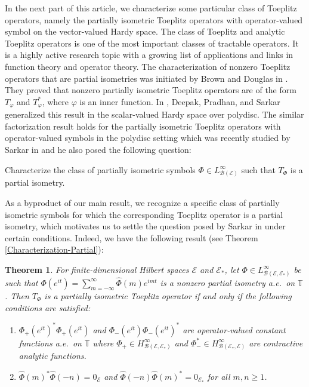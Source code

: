 \documentclass[12pt]{amsart}
\newcommand{\clb}{\mathcal{B}}
\newcommand{\cle}{\mathcal{E}}
\newcommand{\NI}{\noindent}
\newcommand{\T}{\mathbb{T}}
\theoremstyle{definition}
\theoremstyle{plain}
\newtheorem{thm}{Theorem}[section]
\theoremstyle{definition}
\numberwithin{equation}{section}
\let\phi=\varphi
\begin{document}
In the next part of this article, we characterize some particular class of Toeplitz operators, namely the partially isometric Toeplitz operators with operator-valued symbol on the vector-valued Hardy space. The class of Toeplitz and analytic Toeplitz operators is one of the most important classes of tractable operators.
It is a highly active research topic with a growing list of applications and links in function theory and operator theory. The characterization of nonzero Toeplitz operators that are partial isometries was initiated by Brown and Douglas in \cite{BD-Partially}. They proved that nonzero partially isometric Toeplitz operators are of the form $T_{\phi}$ and $T^{*}_{\phi}$, where $\phi$ is an inner function. In \cite{DPS-Partially}, Deepak, Pradhan, and Sarkar generalized this result in the scalar-valued Hardy space over polydisc. The similar factorization result holds for the partially isometric Toeplitz operators with operator-valued symbols in the polydisc setting which was recently studied by Sarkar in \cite{ss} and he also posed the following question:

\begin{center}
\textsf{Characterize the class of  partially isometric symbols $\Phi \in L^\infty_{\clb(\cle)}$ such that $T_\Phi$ is a partial isometry.}
\end{center}

\NI
As a byproduct of our main result, we recognize a specific class of partially isometric symbols for which the corresponding Toeplitz operator is a partial isometry, which motivates us to settle the question posed by Sarkar in \cite{ss} under certain conditions. Indeed, we have the following result (see Theorem \ref{Characterization-Partial}):


\begin{thm}
For finite-dimensional Hilbert spaces $\cle$ and $\cle_*$, let $\Phi \in L^\infty_{\clb(\cle, \cle_*)}$ be such that $\Phi(e^{it})=\sum\limits_{m=-\infty}^\infty \hat{\Phi}(m)e^{imt}$ is a nonzero partial isometry a.e.\ on $\T$. Then $T_\Phi$ is a partially isometric Toeplitz operator if and only if the following conditions are satisfied:
\begin{enumerate}
\item $\Phi_+(e^{it})^*\Phi_+(e^{it})$ and $\Phi_-(e^{it})\Phi_-(e^{it})^*$ are  operator-valued constant functions a.e.\ on $\T$ where $\Phi_+ \in H^\infty_{\clb(\cle,\cle_*)}$ and $\Phi_-^* \in H^\infty_{\clb(\cle_*,\cle)}$ are contractive analytic functions.
\item $\hat{\Phi}(m)^*\hat{\Phi}(-n)=0_\cle$ and $\hat{\Phi}(-n)\hat{\Phi}(m)^*=0_{\cle_*}$ for all $m,n \geq 1$.
\end{enumerate}
\end{thm}
\end{document}
